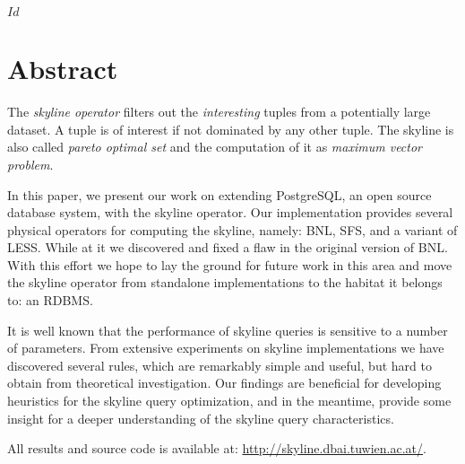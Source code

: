 
\svnInfo $Id$


\chapter*{Abstract\revision}

The \emph{skyline operator} filters out the \emph{interesting} tuples
from a potentially large dataset.  A tuple is of interest if not
dominated by any other tuple.  The skyline is also called 
\emph{pareto optimal set} and the computation of it as
\emph{maximum vector problem}.

In this paper, we present our work on extending PostgreSQL, an open
source database system, with the skyline operator.  Our implementation
provides several physical operators for computing the skyline, namely:
BNL, SFS, and a variant of LESS.  While at it we discovered and fixed
a flaw in the original version of BNL.  With this effort we hope to
lay the ground for future work in this area and move the skyline
operator from standalone implementations to the habitat it belongs to:
an RDBMS.

It is well known that the performance of skyline queries is sensitive
to a number of parameters.  From extensive experiments on skyline
implementations we have discovered several rules, which are remarkably
simple and useful, but hard to obtain from theoretical investigation.
Our findings are beneficial for developing heuristics for the skyline
query optimization, and in the meantime, provide some insight for a
deeper understanding of the skyline query characteristics. 

All results and source code is available at: 
\url{http://skyline.dbai.tuwien.ac.at/}.
